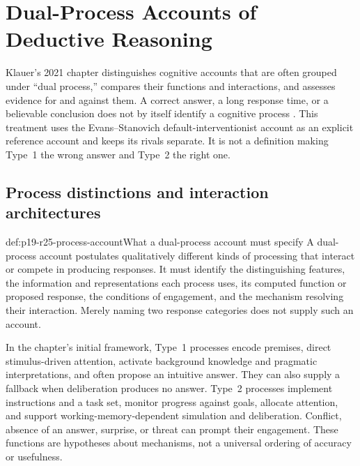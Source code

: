 \chapter{Dual-Process Accounts of Deductive Reasoning}
\label{sec:p19-rationality-2-5}

Klauer's 2021 chapter distinguishes cognitive accounts that are often
grouped under ``dual process,'' compares their functions and interactions,
and assesses evidence for and against them. A correct answer, a long
response time, or a believable conclusion does not by itself identify
a cognitive process \cite[pp.~173--184]{Klauer2021DualProcess}.
This treatment uses the Evans--Stanovich default-interventionist account
as an explicit reference account and keeps its rivals separate. It is
not a definition making Type~1 the wrong answer and Type~2 the right one.

\section{Process distinctions and interaction architectures}

\begin{hbdefinition}{def:p19-r25-process-account}{What a dual-process account must specify}
A dual-process account postulates qualitatively different kinds of
processing that interact or compete in producing responses. It must
identify the distinguishing features, the information and representations
each process uses, its computed function or proposed response, the
conditions of engagement, and the mechanism resolving their interaction.
Merely naming two response categories does not supply such an account.

In the chapter's initial framework, Type~1 processes encode premises,
direct stimulus-driven attention, activate background knowledge and
pragmatic interpretations, and often propose an intuitive answer. They
can also supply a fallback when deliberation produces no answer.
Type~2 processes implement instructions and a task set, monitor progress
against goals, allocate attention, and support working-memory-dependent
simulation and deliberation. Conflict, absence of an answer, surprise,
or threat can prompt their engagement. These functions are hypotheses
about mechanisms, not a universal ordering of accuracy or usefulness.
\end{hbdefinition}

